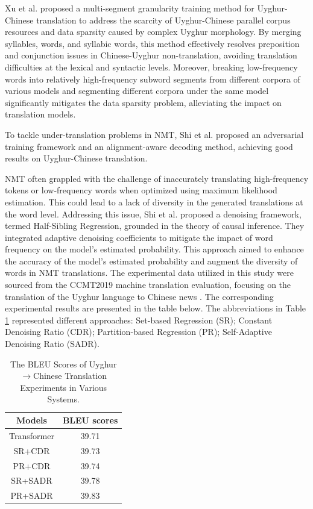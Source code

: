 \documentclass[acmsmall]{acmart}
\begin{document}
Xu et al. proposed a multi-segment granularity training method for Uyghur-Chinese translation to address the scarcity of Uyghur-Chinese parallel corpus resources and data sparsity caused by complex Uyghur morphology. By merging syllables, words, and syllabic words, this method effectively resolves preposition and conjunction issues in Chinese-Uyghur non-translation, avoiding translation difficulties at the lexical and syntactic levels. Moreover, breaking low-frequency words into relatively high-frequency subword segments from different corpora of various models and segmenting different corpora under the same model significantly mitigates the data sparsity problem, alleviating the impact on translation models\cite{4-12}.

To tackle under-translation problems in NMT, Shi et al. proposed an adversarial training framework and an alignment-aware decoding method, achieving good results on Uyghur-Chinese translation\cite{4-13}.

\color{red}
NMT often grappled with the challenge of inaccurately translating high-frequency tokens or low-frequency words when optimized using maximum likelihood estimation. This could lead to a lack of diversity in the generated translations at the word level. Addressing this issue, Shi et al. \cite{shi-etal-2023-ji} proposed a denoising framework, termed Half-Sibling Regression, grounded in the theory of causal inference. They integrated adaptive denoising coefficients to mitigate the impact of word frequency on the model's estimated probability. This approach aimed to enhance the accuracy of the model's estimated probability and augment the diversity of words in NMT translations. The experimental data utilized in this study were sourced from the CCMT2019 machine translation evaluation, focusing on the translation of the Uyghur language to Chinese news \cite{YangMuyun}. The corresponding experimental results are presented in the table below. The abbreviations in Table \ref{Shi} represented different approaches: Set-based Regression (SR); Constant Denoising Ratio (CDR); Partition-based Regression (PR); Self-Adaptive Denoising Ratio (SADR).
\color{black}

\begin{table}[htbp] 
\caption{The BLEU Scores of Uyghur$\rightarrow$Chinese Translation Experiments in Various Systems.}
\label{Shi}
\centering %
\begin{tabular}{cc}
\toprule
 Models & BLEU scores \\
\midrule
        Transformer & 39.71 \\
        SR+CDR & 39.73 \\
        PR+CDR & 39.74 \\
        SR+SADR & 39.78 \\
        PR+SADR & 39.83 \\
\bottomrule
\end{tabular}
\end{table}
\end{document}
